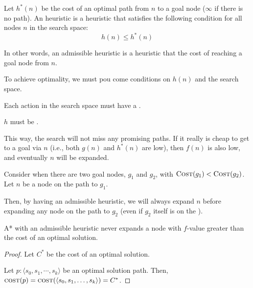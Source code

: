 \begin{listu}
    \begin{definition}[Asmissibility]\label{def:asmissibility}
        Let $h^*(n)$ be the cost of an optimal path from $n$ to a goal node ($\infty$ if there is no path). An  heuristic is a heuristic that satisfies the following condition for all nodes $n$ in the search space: \[
            h(n) \le h^*(n)
        \]
    \end{definition}

    In other words, an admissible heuristic is a heuristic that  the cost of reaching a goal node from $n$.

    To achieve optimality, we must pou come conditions on $h(n)$ and the search space.

    \begin{listu}
        \item Each action in the search space must have a .
        \item $h$ must be .
    \end{listu}

    This way, the search will not miss any promising paths. If it really is cheap to get to a goal via $n$ (i.e., both $g(n)$ and $h^*(n)$ are low), then $f(n)$ is also low, and eventually $n$ will be expanded.

    \begin{example}
        Consider when there are two goal nodes, $g_1$ and $g_2$, with $\textsc{Cost}(g_1) < \textsc{Cost}(g_2)$. Let $n$ be a node on the path to $g_1$.

        Then, by having an admissible heuristic, we will always expand $n$ before expanding any node on the path to $g_2$ (even if $g_2$ itself is on the \Frontier).
    \end{example}

    \begin{proposition}\label{prop:optimal-cost}
        A* with an admissible heuristic never expands a node with $f$-value greater than the cost of an optimal solution.
    \end{proposition}

    \begin{proof}
        Let $C^*$ be the cost of an optimal solution.

        Let $p: \langle s_0, s_1, \cdots, s_k \rangle$ be an optimal solution path. Then, $\textsc{cost}(p) = \textsc{cost}( \langle s_0, s_1, \dots, s_k \rangle) = C^*$.


\end{proof}
\end{listu}

